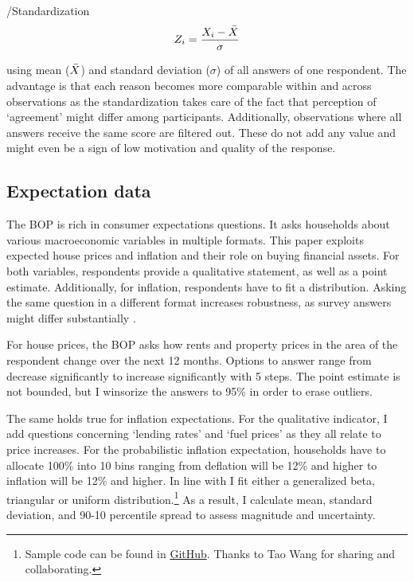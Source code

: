 \documentclass[ProjectABM]{subfiles}
\begin{document}
\begin{verbatimwrite}{\EqDir/Standardization}
	\begin{align}
		Z_i = \frac{X_i - \Bar{X}}{\sigma}  \label{eq:standardization}
	\end{align}
\end{verbatimwrite}


using mean ($\Bar{X}$) and standard deviation ($\sigma$) of all answers of one respondent. The advantage is that each reason becomes more comparable within and across observations as the standardization takes care of the fact that perception of `agreement' might differ among participants. Additionally, observations where all answers receive the same score are filtered out. These do not add any value and might even be a sign of low motivation and quality of the response.
 




\subsection{Expectation data}
The BOP is rich in consumer expectations questions. It asks households about various macroeconomic variables in multiple formats. This paper exploits expected house prices and inflation and their role on buying financial assets. For both variables, respondents provide a qualitative statement, as well as a point estimate. Additionally, for inflation, respondents have to fit a distribution. Asking the same question in a different format increases robustness, as survey answers might differ substantially \citep{potter_et_al_2017prob,diercks2021asymmetric}.

For house prices, the BOP asks how rents and property prices in the area of the respondent change over the next 12 months. Options to answer range from decrease significantly to increase significantly with 5 steps. The point estimate is not bounded, but I winsorize the answers to 95\% in order to erase outliers.

The same holds true for inflation expectations. For the qualitative indicator, I add questions concerning `lending rates' and `fuel prices' as they all relate to price increases. For the probabilistic inflation expectation, households have to allocate 100\% into 10 bins ranging from deflation will be 12\% and higher to inflation will be 12\% and higher. In line with \cite{engelberg_manski_2009distribution} I fit either a generalized beta, triangular or uniform distribution.\footnote{Sample code can be found in \href{https://github.com/AMonninger/DensitySurveyEstimation}{GitHub}. Thanks to Tao Wang for sharing and collaborating.} As a result, I calculate mean, standard deviation, and 90-10 percentile spread to assess magnitude and uncertainty.
\end{document}

